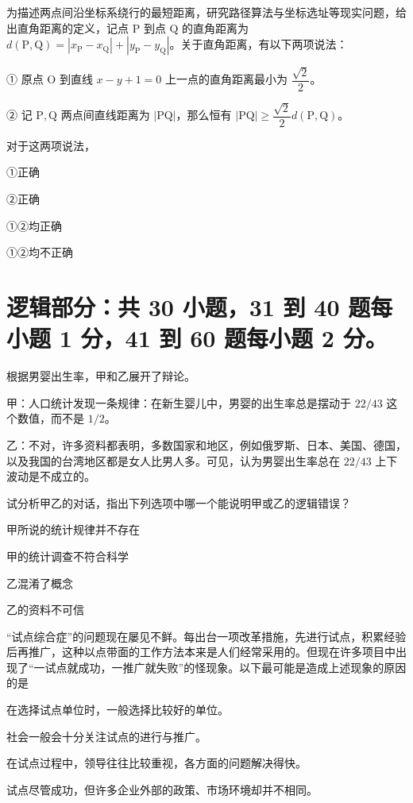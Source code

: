 \documentclass{exam-zh}
\begin{document}
\begin{question}
为描述两点间沿坐标系绕行的最短距离，研究路径算法与坐标选址等现实问题，给出直角距离的定义，记点 $\mathrm{P}$ 到点 $\mathrm{Q}$ 的直角距离为 $d(\mathrm{P},\mathrm{Q})=|x_{\mathrm{P}}-x_{\mathrm{Q}}|+|y_{\mathrm{P}}-y_{\mathrm{Q}}|$。关于直角距离，有以下两项说法：

① 原点 $\mathrm{O}$ 到直线 $x-y+1=0$ 上一点的直角距离最小为 $\dfrac{\sqrt{2}}{2}$。

② 记 $\mathrm{P},\mathrm{Q}$ 两点间直线距离为 $|\mathrm{PQ}|$，那么恒有 $|\mathrm{PQ}|\ge\dfrac{\sqrt{2}}{2}d(\mathrm{P},\mathrm{Q})$。

对于这两项说法，\paren[]
\begin{choices}
  \item ①正确
  \item ②正确
  \item ①②均正确
  \item ①②均不正确
\end{choices}
\end{question}


\section{%
  逻辑部分：共 30 小题，31 到 40 题每小题 1 分，41 到 60 题每小题 2 分。
}

\begin{question}
根据男婴出生率，甲和乙展开了辩论。

甲：人口统计发现一条规律：在新生婴儿中，男婴的出生率总是摆动于 $22/43$ 这个数值，而不是 $1/2$。

乙：不对，许多资料都表明，多数国家和地区，例如俄罗斯、日本、美国、德国，以及我国的台湾地区都是女人比男人多。可见，认为男婴出生率总在 $22/43$ 上下波动是不成立的。

试分析甲乙的对话，指出下列选项中哪一个能说明甲或乙的逻辑错误？\paren[]
\begin{choices}
  \item 甲所说的统计规律并不存在
  \item 甲的统计调查不符合科学
  \item 乙混淆了概念
  \item 乙的资料不可信
\end{choices}
\end{question}

\begin{question}
“试点综合症”的问题现在屡见不鲜。每出台一项改革措施，先进行试点，积累经验后再推广，这种以点带面的工作方法本来是人们经常采用的。但现在许多项目中出现了“一试点就成功，一推广就失败”的怪现象。以下最可能是造成上述现象的原因的是 \paren[]
\begin{choices}
  \item 在选择试点单位时，一般选择比较好的单位。
  \item 社会一般会十分关注试点的进行与推广。
  \item 在试点过程中，领导往往比较重视，各方面的问题解决得快。
  \item 试点尽管成功，但许多企业外部的政策、市场环境却并不相同。
\end{choices}
\end{question}
\end{document}
